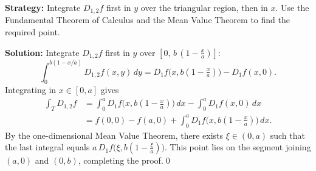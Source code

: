 \noindent\textbf{Strategy:} Integrate $D_{1,2}f$ first in $y$ over the triangular region, then in $x$. Use the Fundamental Theorem of Calculus and the Mean Value Theorem to find the required point.

\bigskip\noindent\textbf{Solution:}
Integrate $D_{1,2}f$ first in $y$ over $[0,\,b\,(1-\tfrac{x}{a})]$:
\[ \int_0^{b(1-x/a)} D_{1,2}f(x,y)\,dy = D_1 f\big(x, b(1-\tfrac{x}{a})\big) - D_1 f(x,0). \]
Integrating in $x\in[0,a]$ gives
\begin{align*}
 \int_T D_{1,2}f &= \int_0^a D_1 f\big(x, b(1-\tfrac{x}{a})\big)\,dx - \int_0^a D_1 f(x,0)\,dx \\ 
 &= f(0,0)-f(a,0) + \int_0^a D_1 f\big(x, b(1-\tfrac{x}{a})\big)\,dx. 
\end{align*}
By the one-dimensional Mean Value Theorem, there exists $\xi\in(0,a)$ such that the last integral equals $a\,D_1 f\big(\xi, b(1-\tfrac{\xi}{a})\big)$. This point lies on the segment joining $(a,0)$ and $(0,b)$, completing the proof.\qed